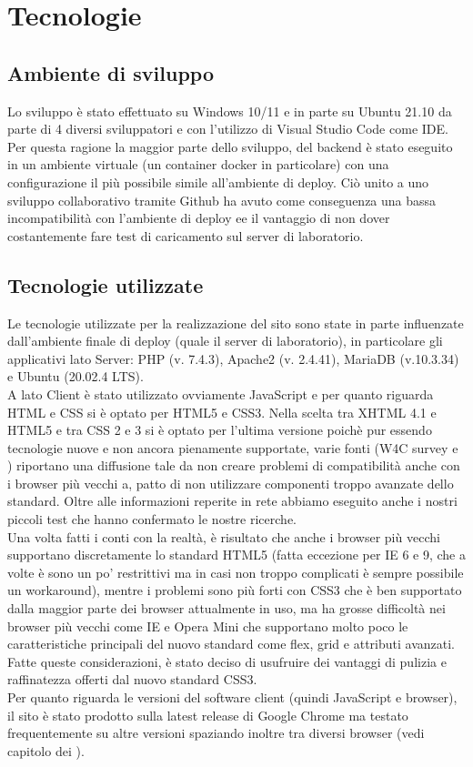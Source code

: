 \section{Tecnologie}
    \subsection{Ambiente di sviluppo}
    Lo sviluppo è stato effettuato su Windows 10/11 e in parte su Ubuntu 21.10 da parte di 4 diversi sviluppatori e con l’utilizzo di Visual Studio Code come IDE.
    Per questa ragione la maggior parte dello sviluppo, del backend è stato eseguito in un ambiente virtuale (un container docker in particolare) con una configurazione il più possibile simile all’ambiente di deploy.
    Ciò unito a uno sviluppo collaborativo tramite Github ha avuto come conseguenza una bassa  incompatibilità con l’ambiente di deploy ee il vantaggio di non dover costantemente fare test di caricamento sul server di laboratorio.
    \subsection{Tecnologie utilizzate}
    Le tecnologie utilizzate per la realizzazione del sito sono state in parte influenzate dall’ambiente finale di deploy (quale il server di laboratorio), in particolare gli applicativi lato Server: PHP (v. 7.4.3), Apache2 (v. 2.4.41), MariaDB (v.10.3.34) e Ubuntu (20.02.4 LTS).\\
    A lato Client è stato utilizzato ovviamente JavaScript e per quanto riguarda HTML e CSS si è optato per HTML5 e CSS3. Nella scelta tra XHTML 4.1 e HTML5 e tra CSS 2 e 3 si è optato per l’ultima versione poichè pur essendo tecnologie nuove e non ancora pienamente supportate, varie fonti (W4C survey e ) riportano una diffusione tale da non creare problemi di compatibilità anche con i browser più vecchi a, patto di non utilizzare componenti troppo avanzate dello standard. Oltre alle informazioni reperite in rete abbiamo eseguito anche i nostri piccoli test che hanno confermato le nostre ricerche.\\
    Una volta fatti i conti con la realtà, è risultato che anche i browser più vecchi supportano discretamente lo standard HTML5 (fatta eccezione per IE 6 e 9, che a volte è sono un po’ restrittivi ma in casi non troppo complicati è sempre possibile un workaround), mentre i problemi sono più forti con CSS3 che è ben supportato dalla maggior parte dei browser attualmente in uso, ma ha grosse difficoltà nei browser più vecchi come IE e Opera Mini che supportano molto poco le caratteristiche principali del nuovo standard come flex, grid e attributi avanzati.\\
    Fatte queste considerazioni, è stato deciso di usufruire dei vantaggi di pulizia e raffinatezza offerti dal nuovo standard CSS3.\\
    Per quanto riguarda le versioni del software client (quindi JavaScript e browser), il sito è stato prodotto sulla latest release di Google Chrome ma testato frequentemente su altre versioni spaziando inoltre tra diversi browser (vedi capitolo dei ).
